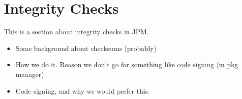 
\section{Integrity Checks}
\label{sec:integrity_check}

This is a section about integrity checks in JPM.

\begin{itemize}
    \item Some background about checksums (probably)
    \item How we do it. Reason we don't go for something like code signing
        (in pkg manager)
    \item Code signing, and why we would prefer this.
\end{itemize}
